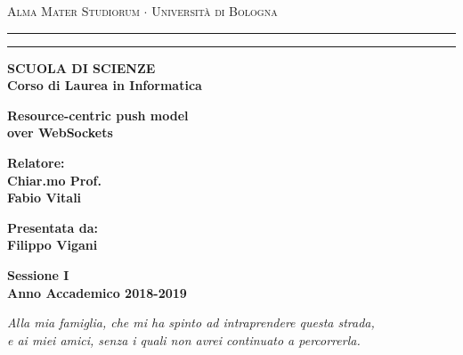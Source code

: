 \documentclass[12pt,a4paper,openright,twoside]{report}
\begin{document}

\begin{titlepage}
\begin{center}
{{\Large{\textsc{Alma Mater Studiorum $\cdot$ Universit\`a di
Bologna}}}} \rule[0.1cm]{15.8cm}{0.1mm}
\rule[0.5cm]{15.8cm}{0.6mm}
{\small{\bf SCUOLA DI SCIENZE\\
Corso di Laurea in Informatica }}
\end{center}
\vspace{40mm}
\begin{center}
{\LARGE{\bf Resource-centric push model}}\\
\vspace{3mm}
{\LARGE{\bf over WebSockets}}\\
\end{center}
\vspace{40mm}
\par
\noindent
\begin{minipage}[t]{0.47\textwidth}
{\large{\bf Relatore:\\
Chiar.mo Prof.\\
Fabio Vitali}}
\end{minipage}
\hfill
\begin{minipage}[t]{0.47\textwidth}\raggedleft
{\large{\bf Presentata da:\\
Filippo Vigani}}
\end{minipage}
\vspace{30mm}
\begin{center}
{\large{\bf Sessione I\\%
Anno Accademico 2018-2019}}%
\end{center}
\end{titlepage}


\clearpage{\pagestyle{empty}\cleardoublepage}
\thispagestyle{empty}
\normalsize                                  
\begin{flushright}
\em
\itshape Alla mia famiglia, che mi ha spinto ad intraprendere questa strada,\\
e ai miei amici, senza i quali non avrei continuato a percorrerla.

\end{flushright}
\end{document}
